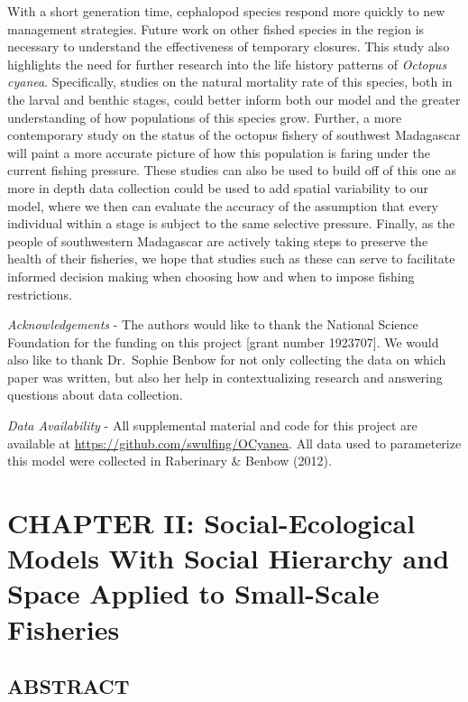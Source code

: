 \documentclass[
  12pt,
]{article}
\begin{document}
With a short generation time, cephalopod species respond more quickly to new management strategies. Future work on other fished species in the region is necessary to understand the effectiveness of temporary closures. This study also highlights the need for further research into the life history patterns of \emph{Octopus cyanea}. Specifically, studies on the natural mortality rate of this species, both in the larval and benthic stages, could better inform both our model and the greater understanding of how populations of this species grow. Further, a more contemporary study on the status of the octopus fishery of southwest Madagascar will paint a more accurate picture of how this population is faring under the current fishing pressure. These studies can also be used to build off of this one as more in depth data collection could be used to add spatial variability to our model, where we then can evaluate the accuracy of the assumption that every individual within a stage is subject to the same selective pressure. Finally, as the people of southwestern Madagascar are actively taking steps to preserve the health of their fisheries, we hope that studies such as these can serve to facilitate informed decision making when choosing how and when to impose fishing restrictions.

\emph{Acknowledgements} - The authors would like to thank the National Science Foundation for the funding on this project {[}grant number 1923707{]}. We would also like to thank Dr.~Sophie Benbow for not only collecting the data on which paper was written, but also her help in contextualizing research and answering questions about data collection.

\emph{Data Availability} - All supplemental material and code for this project are available at \url{https://github.com/swulfing/OCyanea}. All data used to parameterize this model were collected in Raberinary \& Benbow (2012).

\newpage

\hypertarget{chapter-ii-social-ecological-models-with-social-hierarchy-and-space-applied-to-small-scale-fisheries}{%
\section{CHAPTER II: Social-Ecological Models With Social Hierarchy and Space Applied to Small-Scale Fisheries}\label{chapter-ii-social-ecological-models-with-social-hierarchy-and-space-applied-to-small-scale-fisheries}}

\hypertarget{abstract-2}{%
\subsection{ABSTRACT}\label{abstract-2}}
\end{document}
